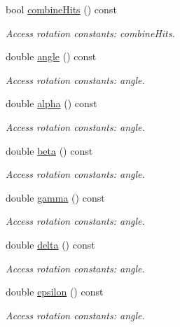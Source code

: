 \begin{DoxyCompactItemize}
bool \hyperlink{struct_d_d4hep_1_1_x_m_l_1_1_child_value_aed718aeaac9e1ee48a03ded09832909e}{combine\+Hits} () const
\begin{DoxyCompactList}\small\item\em Access rotation constants\+: combine\+Hits. \end{DoxyCompactList}\item 
double \hyperlink{struct_d_d4hep_1_1_x_m_l_1_1_child_value_a58e290483e9237ab5c5e40e2d1ea7321}{angle} () const
\begin{DoxyCompactList}\small\item\em Access rotation constants\+: angle. \end{DoxyCompactList}\item 
double \hyperlink{struct_d_d4hep_1_1_x_m_l_1_1_child_value_aaeba5280b063dfba0009b5aa1ea89767}{alpha} () const
\begin{DoxyCompactList}\small\item\em Access rotation constants\+: angle. \end{DoxyCompactList}\item 
double \hyperlink{struct_d_d4hep_1_1_x_m_l_1_1_child_value_a959e9977e7811b7c8603c2885194917b}{beta} () const
\begin{DoxyCompactList}\small\item\em Access rotation constants\+: angle. \end{DoxyCompactList}\item 
double \hyperlink{struct_d_d4hep_1_1_x_m_l_1_1_child_value_a8346008b0e9d28425b02ea0d1fd40500}{gamma} () const
\begin{DoxyCompactList}\small\item\em Access rotation constants\+: angle. \end{DoxyCompactList}\item 
double \hyperlink{struct_d_d4hep_1_1_x_m_l_1_1_child_value_a017711036f2a3bcf8fc78dc68e70e240}{delta} () const
\begin{DoxyCompactList}\small\item\em Access rotation constants\+: angle. \end{DoxyCompactList}\item 
double \hyperlink{struct_d_d4hep_1_1_x_m_l_1_1_child_value_ac10f696f4e689536b14f4b4df9160a88}{epsilon} () const
\begin{DoxyCompactList}\small\item\em Access rotation constants\+: angle. \end{DoxyCompactList}\item 

\end{DoxyCompactItemize}
